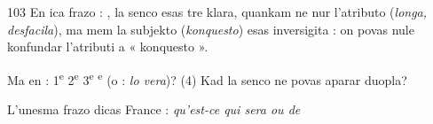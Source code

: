 \begin{VUpage}[107]{103}
En ica frazo : , la senco\nl
esas tre klara, quankam ne nur l'atributo (\textit{longa, desfacila}),\nl
ma mem la subjekto (\textit{konquesto}) esas inversigita : on povas\nl
nule konfundar l'atributi a « konquesto ».

Ma en : 1\textsuperscript{e}  2\textsuperscript{e} \nl
{} 3\textsuperscript{e} \textsuperscript{e}  (o : \textit{lo vera})? (4) Kad la senco ne povas\nl
aparar duopla?

L'unesma frazo dicas France : \textit{qu'est-ce qui sera ou de}\cc
\end{VUpage}

